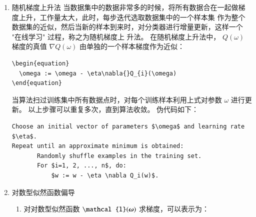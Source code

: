 \documentclass[11pt]{ctexart}
\newcommand{\bm}[1]{\mbox{\boldmath{$#1$}}}
\begin{document}
\begin{enumerate}
综上， 对于体系形式可以用下式表示的目标函数
\lstset{language=[LaTeX]TeX,label= ,caption= ,captionpos=b,numbers=none}
\begin{lstlisting}
\begin{equation}
  Q(\omege) = \sum^{n}_{i=1}Q_{i}(\omega)
  \end{equation}
\end{lstlisting}
其中， \(\omega\) 是我们需要估计的参数， \(Q_{i}\) 对应的是数据集中第 \(i\) 个点，传统的梯度上升法估计
参数 \(\omega\) 方法是，利用下式的梯度上升公式进行迭代：
\lstset{language=[LaTeX]TeX,label= ,caption= ,captionpos=b,numbers=none}
\begin{lstlisting}
\begin{equation}
  \omega := \omega - \eta\nabla{}Q(\omega) = \omega - \eta\sum^{n}_{i=1}\nabla{}Q_{i}(\omega)
  \end{equation}
\end{lstlisting}
其中， \(\eta\) 是 'step' 大小
\item 随机梯度上升法
\label{sec:orgheadline52}
当数据集中的数据非常多的时候，将所有数据合在一起做梯度上升，工作量太大，此时，每步迭代选取数据集中的一个样本集
作为整个数据集的近似，然后当新的样本到来时，对分类器进行增量更新，这样一个 "在线学习" 过程，称之为随机梯度上
升法。
在随机梯度上升法中， \(Q(\omega)\) 梯度的真值 \(\nabla{}Q(\omega)\) 由单独的一个样本梯度作为近似：
\lstset{language=[LaTeX]TeX,label= ,caption= ,captionpos=b,numbers=none}
\begin{lstlisting}
\begin{equation}
  \omega := \omega - \eta\nabla{}Q_{i}(\omega)
\end{equation}
\end{lstlisting}
当算法扫过训练集中所有数据点时，对每个训练样本利用上式对参数 \(\omega\) 进行更新。
以上步骤可以重复多次，直到算法收敛。
伪代码如下：
\begin{verbatim}
Choose an initial vector of parameters $\omega$ and learning rate $\eta$.
Repeat until an approximate minimum is obtained:
       Randomly shuffle examples in the training set.
       For $i=1, 2, ..., n$, do:
           $w := w - \eta \nabla Q_i(w)$.
\end{verbatim}
\item 对数型似然函数偏导
\label{sec:orgheadline53}
\begin{enumerate}
\item 对对数型似然函数 \(\mathcal{l}({\bm \omega})\) 求梯度，可以表示为：
\lstset{language=[LaTeX]TeX,label= ,caption= ,captionpos=b,numbers=none}
\begin{lstlisting}

\end{lstlisting}
\end{enumerate}
\end{enumerate}
\end{document}
